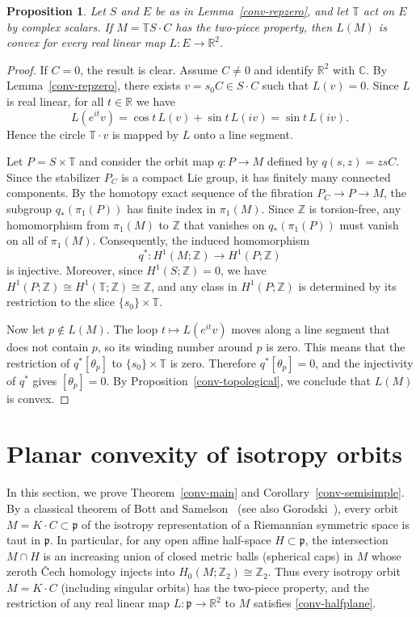 \documentclass[11pt,reqno]{amsart}
\newtheorem{proposition}[theorem]{Proposition}
\theoremstyle{remark}
\newcommand{\R}{\mathbb R}
\newcommand{\C}{\mathbb C}
\newcommand{\Z}{\mathbb Z}
\newcommand{\TT}{\mathbb T}
\newcommand{\pfr}{\mathfrak p}
\begin{document}
\begin{proposition}\label{conv-circle}
Let $S$ and $E$ be as in Lemma~\ref{conv-repzero}, and let
$\TT$ act on $E$ by complex scalars. If $M=\TT S\cdot C$ has
the two-piece property, then $L(M)$ is convex for every real linear map
$L:E\to\R^2$.
\end{proposition}
\begin{proof}
If $C=0$, the result is clear. Assume $C\ne0$ and identify $\R^2$ with
$\C$. By Lemma~\ref{conv-repzero}, there exists $v=s_0C\in S\cdot C$
such that $L(v)=0$. Since $L$ is real linear, for all $t\in\R$ we have
\[
 L(e^{it}v)=\cos t\,L(v)+\sin t\,L(iv)
           =\sin t\,L(iv).
\]
Hence the circle $\TT\cdot v$ is mapped by $L$ onto a line segment.

Let $P=S\times\TT$ and consider the orbit map $q:P\to M$ defined by
$q(s,z)=zsC$. Since the stabilizer $P_C$ is a compact Lie group, it has
finitely many connected components. By the homotopy exact sequence of
the fibration $P_C\to P\to M$, the subgroup $q_*(\pi_1(P))$ has finite
index in $\pi_1(M)$. Since $\Z$ is torsion-free, any homomorphism from
$\pi_1(M)$ to $\Z$ that vanishes on $q_*(\pi_1(P))$ must vanish on all
of $\pi_1(M)$. Consequently, the induced homomorphism
\[
 q^*:H^1(M;\Z)\longrightarrow H^1(P;\Z)
\]
is injective. Moreover, since $H^1(S;\Z)=0$, we have
$H^1(P;\Z)\cong H^1(\TT;\Z)\cong\Z$, and any class in $H^1(P;\Z)$ is
determined by its restriction to the slice $\{s_0\}\times\TT$.

Now let $p\notin L(M)$. The loop $t\mapsto L(e^{it}v)$ moves along a
line segment that does not contain $p$, so its winding number around $p$
is zero. This means that the restriction of $q^*[\theta_p]$ to
$\{s_0\}\times\TT$ is zero. Therefore $q^*[\theta_p]=0$, and the
injectivity of $q^*$ gives $[\theta_p]=0$. By
Proposition~\ref{conv-topological}, we conclude that $L(M)$ is convex.
\end{proof}

\section{Planar convexity of isotropy orbits}\label{sec:isotropy}

In this section, we prove Theorem~\ref{conv-main} and
Corollary~\ref{conv-semisimple}. By a classical theorem of Bott and
Samelson~\cite[Theorem~I$'$, page~965]{BottSamelson1958} (see also
Gorodski~\cite[Sections~2--3, pages~62--65]{Gorodski2006}), every orbit
$M=K\cdot C\subset\pfr$ of the isotropy representation of a Riemannian
symmetric space is taut in $\pfr$. In particular, for any open affine
half-space $H\subset\pfr$, the intersection $M\cap H$ is an increasing
union of closed metric balls (spherical caps) in $M$ whose zeroth
\v{C}ech homology injects into $H_0(M;\Z_2)\cong\Z_2$. Thus every
isotropy orbit $M=K\cdot C$ (including singular orbits) has the
two-piece property, and the restriction of any real linear map
$L:\pfr\to\R^2$ to $M$ satisfies \eqref{conv-halfplane}.
\end{document}
